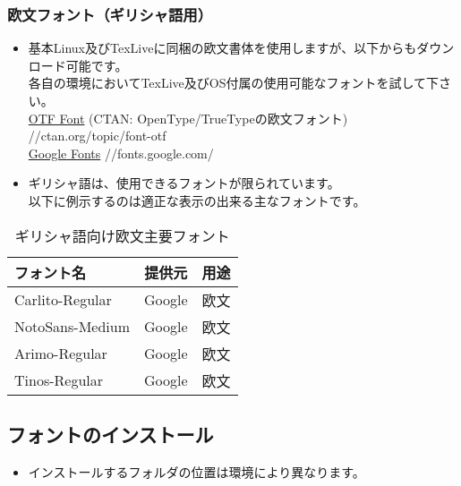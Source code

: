 \documentclass[a4paper,10pt]{ltjsarticle}
\begin{document}
\subsubsection{欧文フォント（ギリシャ語用）}

\begin{itemize} 
  \item 基本Linux及びTexLiveに同梱の欧文書体を使用しますが、以下からもダウンロード可能です。\\
  各自の環境においてTexLive及びOS付属の使用可能なフォントを試して下さい。\\ 
\href{https://ctan.org/topic/font-otf}{OTF Font} (CTAN: OpenType/TrueTypeの欧文フォント)
//ctan.org/topic/font-otf\\
\href{https://fonts.google.com/}{Google Fonts} //fonts.google.com/

\end{itemize}

\begin{itemize}
  \item ギリシャ語は、使用できるフォントが限られています。\\
以下に例示するのは適正な表示の出来る主なフォントです。\vspace{-4mm}
\end{itemize}
\begin{table}[h]
\begin{center}
\begin{tabular}{l|c|l}
\textbf{フォント名} & \textbf{提供元} & \textbf{用途}\\
\hline
Carlito-Regular & Google & 欧文\\%
NotoSans-Medium & Google & 欧文\\%
Arimo-Regular & Google & 欧文\\%
Tinos-Regular & Google & 欧文\\%
\end{tabular}
\caption{ギリシャ語向け欧文主要フォント}
\end{center}
\end{table}
\vspace{-8mm}

\subsection{フォントのインストール}
\begin{itemize}
  \item インストールするフォルダの位置は環境により異なります。\vspace{-4mm}
\end{itemize}
\end{document}
